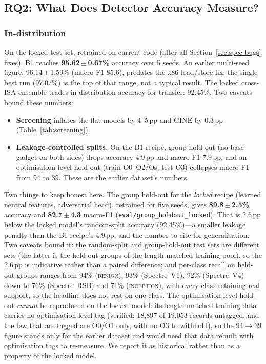 \documentclass[conference]{IEEEtran}
\begin{document}

\subsection{RQ2: What Does Detector Accuracy Measure?}
\label{sec:detresults}

\subsubsection{In-distribution}
\label{sec:indist}
On the locked test set, retrained on current code (after all
Section~\ref{sec:spec-bugs} fixes), B1 reaches \textbf{95.62\,$\pm$\,0.67\%}
accuracy over 5 seeds. An earlier multi-seed figure, 96.14\,$\pm$\,1.59\%
(macro-F1 85.6), predates the x86 load/store fix; the single best run
(97.07\%) is the top of that range, not a typical result. The locked
cross-ISA ensemble trades in-distribution accuracy for transfer: 92.45\%.
Two caveats bound these numbers:
\begin{itemize}[itemsep=1pt,leftmargin=1.2em]
  \item \textbf{Screening} inflates the flat models by 4--5\,pp and GINE by
    0.3\,pp (Table~\ref{tab:screening}).
  \item \textbf{Leakage-controlled splits.} On the B1 recipe, group hold-out
    (no base gadget on both sides) drops accuracy 4.9\,pp and macro-F1 7.9\,pp,
    and an optimisation-level hold-out (train O0--O2/Os, test O3) collapses
    macro-F1 from 94 to 39. These are the earlier dataset's numbers.
\end{itemize}
Two things to keep honest here. The group hold-out for the \emph{locked}
recipe (learned neutral features, adversarial head), retrained for five seeds,
gives \textbf{89.8\,$\pm$\,2.5\%} accuracy and \textbf{82.7\,$\pm$\,4.3}
macro-F1 (\texttt{eval/group\_holdout\_locked}). That is 2.6\,pp below the
locked model's random-split accuracy (92.45\%)---a smaller leakage penalty
than the B1 recipe's 4.9\,pp, and the number to cite for generalisation. Two
caveats bound it: the random-split and group-hold-out test sets are different
sets (the latter is the held-out groups of the length-matched training pool),
so the 2.6\,pp is indicative rather than a paired difference; and per-class
recall on held-out groups ranges from 94\% (\textsc{benign}), 93\%
(Spectre~V1), 92\% (Spectre~V4) down to 76\% (Spectre~RSB) and 71\%
(\textsc{inception}), with every class retaining real support, so the headline
does not rest on one class. The optimisation-level hold-out \emph{cannot} be reproduced on the locked
model: its length-matched training data carries no optimisation-level tag
(verified: 18{,}897 of 19{,}053 records untagged, and the few that are tagged
are O0/O1 only, with no O3 to withhold), so the 94$\to$39 figure stands only
for the earlier dataset and would need that data rebuilt with optimisation tags
to re-measure. We report it as historical rather than as a property of the
locked model.
\end{document}
